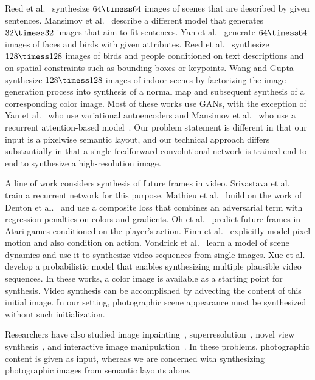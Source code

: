 Reed et al.~\cite{Reed2016:ICML} synthesize $64\timess 64$ images of scenes that are described by given sentences. Mansimov et al.~\cite{Mansimov2015} describe a different model that generates $32\timess 32$ images that aim to fit sentences. Yan et al.~\cite{Yan2016:ECCV} generate $64\timess 64$ images of faces and birds with given attributes. Reed et al.~\cite{Reed2016:NIPS} synthesize $128\timess 128$ images of birds and people conditioned on text descriptions and on spatial constraints such as bounding boxes or keypoints. Wang and Gupta~\cite{WangGupta2016} synthesize $128\timess 128$ images of indoor scenes by factorizing the image generation process into synthesis of a normal map and subsequent synthesis of a corresponding color image. Most of these works use GANs, with the exception of Yan et al.~\cite{Yan2016:ECCV} who use variational autoencoders and Mansimov et al.~\cite{Mansimov2015} who use a recurrent attention-based model~\cite{Gregor2015}. Our problem statement is different in that our input is a pixelwise semantic layout, and our technical approach differs substantially in that a single feedforward convolutional network is trained end-to-end to synthesize a high-resolution image.

A line of work considers synthesis of future frames in video. Srivastava et al.~\cite{Srivastava2015} train a recurrent network for this purpose. Mathieu et al.~\cite{Mathieu2016} build on the work of Denton et al.~\cite{Denton2015} and use a composite loss that combines an adversarial term with regression penalties on colors and gradients. Oh et al.~\cite{Oh2015} predict future frames in Atari games conditioned on the player's action. Finn et al.~\cite{Finn2016} explicitly model pixel motion and also condition on action. Vondrick et al.~\cite{Vondrick2016} learn a model of scene dynamics and use it to synthesize video sequences from single images. Xue et al.~\cite{Xue2016} develop a probabilistic model that enables synthesizing multiple plausible video sequences. In these works, a color image is available as a starting point for synthesis. Video synthesis can be accomplished by advecting the content of this initial image.
In our setting, photographic scene appearance must be synthesized without such initialization.

Researchers have also studied image inpainting~\cite{Pathak2016}, superresolution~\cite{Bruna2016,Johnson2016,Ledig2016}, novel view synthesis~\cite{Flynn2016,Tatarchenko2016,Zhou2016}, and interactive image manipulation~\cite{Zhu2016}. In these problems, photographic content is given as input, whereas we are concerned with synthesizing photographic images from semantic layouts alone.
